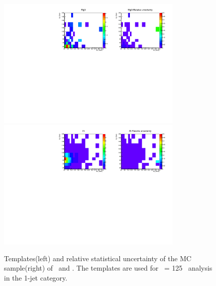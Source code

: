 \begin{figure}[htp]
\centering
\includegraphics[width=0.8\textwidth]{figures/2dtemplate_Wg3l_mH125_1j.pdf}
\includegraphics[width=0.8\textwidth]{figures/2dtemplate_Ztt_mH125_1j.pdf}
\caption{Templates(left) and relative statistical uncertainty of the MC sample(right) 
of \wgammastar\ and \ztt. 
The templates are used for \mHi\ = 125 \GeV\ analysis in the 1-jet category.}
\label{fig:2dtemplate_125_1j_4}
\end{figure} 


